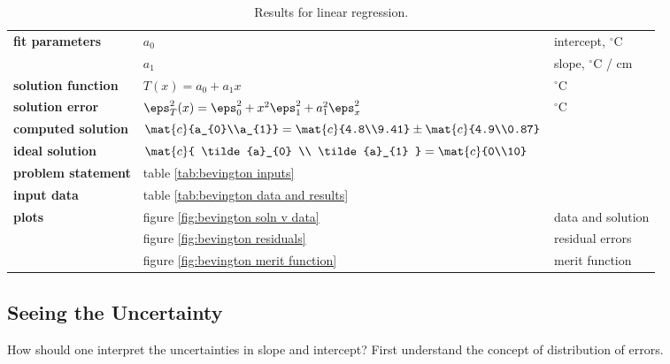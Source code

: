   \begin{table}[t]  %
    \caption{Results for linear regression.}
    \begin{center}
      \begin{tabular}{lll}
        \bf{fit parameters} & $a_{0}$ & intercept, $^{\circ}$C \\
                            & $a_{1}$ & slope, $^{\circ}$C / cm \\
        \bf{solution function} & $T(x) = a_{0} + a_{1} x$ & $^{\circ}$C \\
        \bf{solution error} & $\eps_{T}^{2}(x) = \eps_{0}^{2} + x^{2} \eps_{1}^{2} + a_{1}^{2} \eps_{x}^{2} $ &$^{\circ}$C \\
        \bf{computed solution} & $\mat{c}{a_{0}\\a_{1}} = \mat{c}{4.8\\9.41} \pm \mat{c}{4.9\\0.87}$ \\
        \bf{ideal solution} & $\mat{c}{ \tilde{a}_{0} \\ \tilde{a}_{1} } = \mat{c}{0\\10}$ \\[5pt]%
        \bf{problem statement} & table \ref{tab:bevington inputs} \\
        \bf{input data}        & table \ref{tab:bevington data and results} \\
        \bf{plots}          & figure \ref{fig:bevington soln v data} & data and solution \\
                            & figure \ref{fig:bevington residuals} & residual errors \\
                            & figure \ref{fig:bevington merit function} & merit function \\
      \end{tabular}
    \end{center}
  \label{tab:bevington solution}
  \end{table}%
  
\subsection{Seeing the Uncertainty}  %
How should one interpret the uncertainties in slope and intercept? First understand the concept of distribution of errors.

